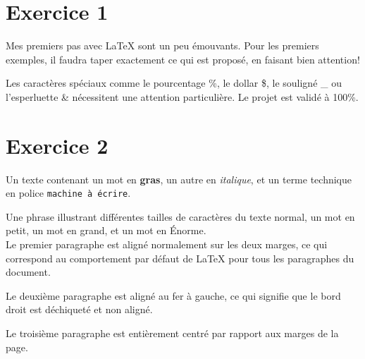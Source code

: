 \documentclass[12pt,a4paper]{article}
\begin{document}
\section*{Exercice 1}

\indent Mes premiers pas avec \LaTeX{} sont un peu émouvants. Pour les premiers exemples, il faudra taper exactement ce qui est proposé, en faisant bien attention!

Les caractères spéciaux comme le pourcentage \%, le dollar \$, le souligné \_ ou l'esperluette \& nécessitent une attention particulière. Le projet est validé à 100\%.

\section*{Exercice 2}
Un texte contenant un mot en \textbf{gras}, un autre en \textit{italique}, et un terme technique en police \texttt{machine à écrire}.

Une phrase illustrant différentes tailles de caractères du texte normal, un mot en {\small petit}, un mot en {\large grand}, et un mot en {\Huge Énorme}.\\

Le premier paragraphe est aligné normalement sur les deux marges, ce qui correspond au comportement par défaut de \LaTeX{} pour tous les paragraphes du document.

\begin{flushleft}
Le deuxième paragraphe est aligné au fer à gauche, ce qui signifie que le bord droit est déchiqueté et non aligné.
\end{flushleft}

\begin{center}
Le troisième paragraphe est entièrement centré par rapport aux marges de la page.
\end{center}
\end{document}
